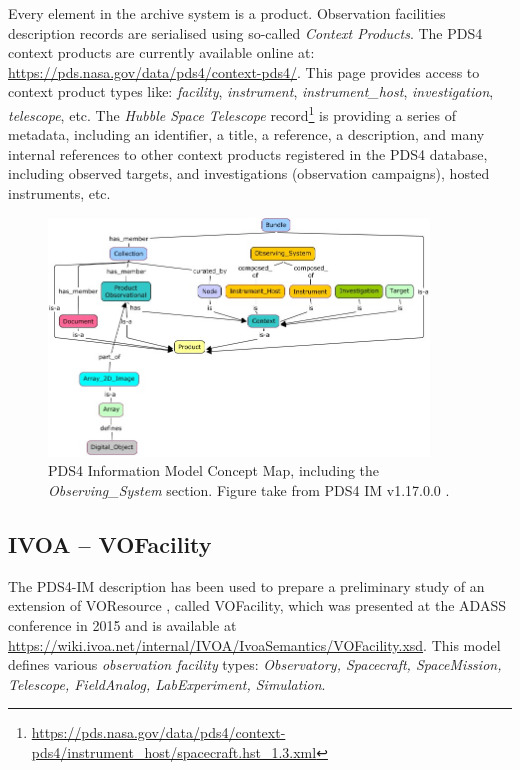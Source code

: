 \documentclass[11pt,a4paper]{ivoa}
\begin{document}
Every element in the archive system is a product. Observation 
facilities description records are serialised using so-called 
\emph{Context Products}. The PDS4 context
products are currently available online at: 
\url{https://pds.nasa.gov/data/pds4/context-pds4/}. This 
page provides access to context product types like: \emph{facility}, 
\emph{instrument}, \emph{instrument\_host}, \emph{investigation}, 
\emph{telescope}, etc. The \emph{Hubble Space Telescope} 
record\footnote{\protect\url{https://pds.nasa.gov/data/pds4/context-pds4/instrument_host/spacecraft.hst_1.3.xml}} 
is providing a series of metadata, including an identifier, a title, 
a reference, a description, and many internal references to other 
context products registered in the PDS4 database, including 
observed targets, and investigations (observation campaigns), hosted 
instruments, etc.

\begin{figure}
\centering\includegraphics[width=0.9\textwidth]{pds4-concept-map.jpg}
\caption{PDS4 Information Model Concept Map, including the 
\emph{Observing\_System} section. Figure take from PDS4 IM v1.17.0.0 
\protect\citep{pds4-im-v1H00}.}\label{fig:pds4-concept-map}
\end{figure}

\subsection{IVOA -- VOFacility}

The PDS4-IM description has been used to prepare a preliminary study of
an extension of VOResource \citep{2018ivoa.spec.0625P}, called VOFacility, 
which was presented at the ADASS conference in 2015 \citep{Louys:2015to} 
and is available at \url{https://wiki.ivoa.net/internal/IVOA/IvoaSemantics/VOFacility.xsd}. 
This model defines various \emph{observation facility} types: 
\emph{Observatory, Spacecraft, SpaceMission, Telescope, FieldAnalog,
LabExperiment, Simulation}. 
\end{document}
